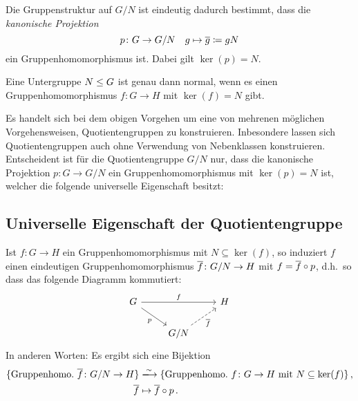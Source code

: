 Die Gruppenstruktur auf $G/N$ ist eindeutig dadurch bestimmt, dass die \emph{kanonische Projektion}
\[
            p
  \colon    G
  \to       G/N
  \quad     g
  \mapsto   \overline{g}
  \coloneqq  gN
\]
ein Gruppenhomomorphismus ist.
Dabei gilt $\ker(p) = N$.

\begin{corollary}
  Eine Untergruppe $N \mathrel{\leq} G$ ist genau dann normal, wenn es einen Gruppenhomomorphismus $f \colon G \to H$ mit $\ker(f) = N$ gibt.
\end{corollary}

\begin{remark}
  Es handelt sich bei dem obigen Vorgehen um eine von mehrenen möglichen Vorgehensweisen, Quotientengruppen zu konstruieren.
  Inbesondere lassen sich Quotientengruppen auch ohne Verwendung von Nebenklassen konstruieren.
  Entscheident ist für die Quotientengruppe $G/N$ nur, dass die kanonische Projektion $p \colon G \to G/N$ ein Gruppenhomomorphismus mit $\ker(p) = N$ ist, welcher die folgende universelle Eigenschaft besitzt:
\end{remark}



\subsection{Universelle Eigenschaft der Quotientengruppe}

\begin{theorem}
  Ist $f \colon G \to H$ ein Gruppenhomomorphismus mit $N \subseteq \ker(f)$, so induziert $f$ einen eindeutigen Gruppenhomomorphismus $\overline{f} \colon G/N \to H$ mit $f = \overline{f} \circ p$, d.h.\ so dass das folgende Diagramm kommutiert:
  \[
    \begin{tikzcd}
        G
        \arrow{rr}[above]{f}
        \arrow{dr}[below left]{p}
      & {}
      & H
      \\
        {}
      & G/N
        \arrow[dashed]{ru}[below right]{\induced{f}}
      & {}
    \end{tikzcd}
  \]
  In anderen Worten:
  Es ergibt sich eine Bijektion
  \begin{align*}
                            \{ \text{Gruppenhomo.\ $\induced{f} \colon G/N \to H$} \}
    &\xlongrightarrow{\sim} \{ \text{Gruppenhomo.\ $f \colon G \to H$ mit $N \subseteq \ker(f)$} \} \,,  \\
                            \induced{f}
    &\mapsto                \induced{f} \circ p \,.
  \end{align*}
\end{theorem}

